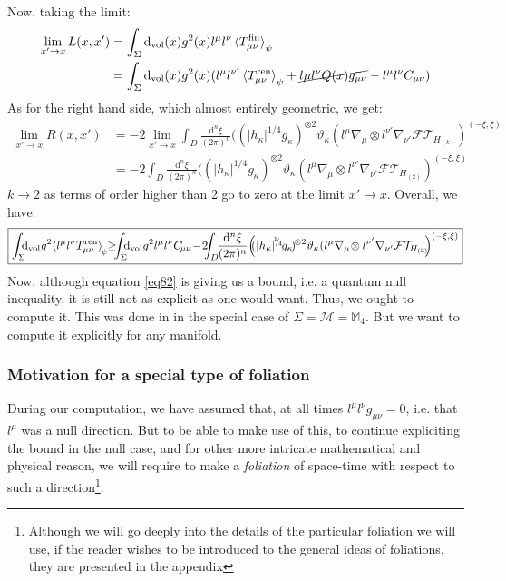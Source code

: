 \documentclass[a4paper,11pt]{article}
\numberwithin{equation}{section}
\theoremstyle{definition}
\renewcommand{\d}{{\mathrm{d}}}
\begin{document}
Now, taking the limit:
\begin{align*}
    \lim_{x'\to x}L(x,x') &= \int_\Sigma \d_\mathrm{vol}(x) g^2(x) l^\mu l^\nu\braket{T^\mathrm{fin}_{\mu\nu}}_\psi\\
    &= \int_\Sigma \d_\mathrm{vol}(x) g^2(x) (l^\mu l^{\nu'}\braket{T^\mathrm{ren}_{\mu\nu}}_\psi+\cancel{l\mu l^\nu Q(x)g_{\mu\nu}}-l^\mu l^\nu C_{\mu\nu})
\end{align*}
As for the right hand side, which almost entirely geometric, we get:
\begin{align*}
    \lim_{x'\to x} R(x,x') &= -2\lim_{x'\to x}\int_D\frac{\d^n\xi}{(2\pi)^n}((|h_\kappa|^{1/4}g_\kappa)^{\otimes 2}\vartheta_\kappa(l^\mu\nabla_\mu\otimes l^{\nu'}\nabla_{\nu'}\mathcal{FT}_{H_{(k)}})^{(-\xi,\xi)}\\
    &=-2\int_D\frac{\d^n\xi}{(2\pi)^n}((|h_\kappa|^{1/4}g_\kappa)^{\otimes 2}\vartheta_\kappa(l^\mu\nabla_\mu\otimes l^{\nu'}\nabla_{\nu'}\mathcal{FT}_{H_{(2)}})^{(-\xi,\xi)}
\end{align*}
$k\to2$ as terms of order higher than 2 go to zero at the limit $x'\to x$. Overall, we have:
\begin{equation}\label{eq82}
    \boxed{\int_\Sigma \!\!\!\d_\mathrm{vol} g^2 \!\braket{l^\mu l^\nu T^\mathrm{ren}_{\mu\nu}}_{\!\psi} \!\!\geq\!\!\! \int_\Sigma \!\!\!\d_\mathrm{vol} g^2l^\mu l^\nu C_{\!\mu\nu}\!-\!2\!\!\!\int_D\!\!\frac{\d^n\xi}{(2\pi)^n}\!\left(\!\!(|h_\kappa|^{\!^1\!\!/_{\!4}}\!g_\kappa\!)^{\!\otimes 2}\vartheta_\kappa(l^\mu\nabla_\mu\!\otimes l^{\nu'}\nabla_{\nu'}\mathcal{FT}_{\!\!H_{(2)}}\!\!\right)^{(-\xi,\xi)}}
\end{equation}
Now, although equation \ref{eq82} is giving us a bound, i.e. a quantum null inequality, it is still not as explicit as one would want. Thus, we ought to compute it. This was done in \cite{DSNEC} in the special case of $\Sigma=\mathcal{M}=\mathbb{M}_4$. But we want to compute it explicitly for any manifold.
\subsubsection{Motivation for a special type of foliation}
During our computation, we have assumed that, at all times $l^\mu l^\nu g_{\mu\nu}=0$, i.e. that $l^\mu$ was a null direction. But to be able to make use of this, to continue expliciting the bound in the null case, and for other more intricate mathematical and physical reason, we will require to make a \emph{foliation} of space-time with respect to such a direction\footnote{\color{red} Although we will go deeply into the details of the particular foliation we will use, if the reader wishes to be introduced to the general ideas of foliations, they are presented in the appendix}.
\end{document}
